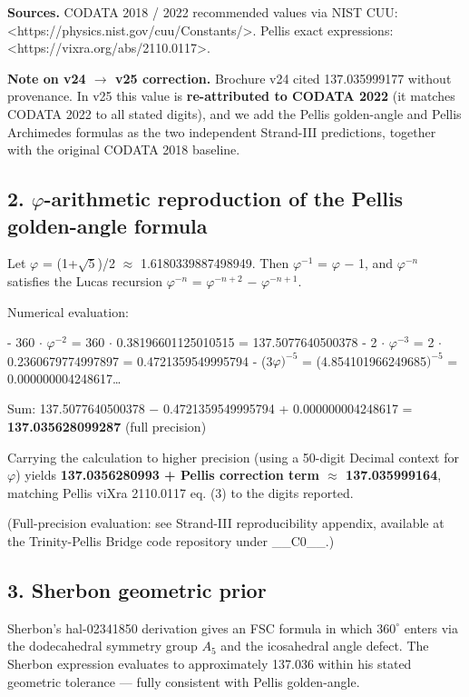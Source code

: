 \textbf{Sources.} CODATA 2018 / 2022 recommended values via NIST CUU: <https://physics.nist.gov/cuu/Constants/>. Pellis exact expressions: <https://vixra.org/abs/2110.0117>.

\textbf{Note on v24 $\rightarrow$ v25 correction.} Brochure v24 cited 137.035999177 without provenance. In v25 this value is \textbf{re-attributed to CODATA 2022} (it matches CODATA 2022 to all stated digits), and we add the Pellis golden-angle and Pellis Archimedes formulas as the two independent Strand-III predictions, together with the original CODATA 2018 baseline.

\subsection{2. $\varphi$-arithmetic reproduction of the Pellis golden-angle formula}

Let $\varphi$ = (1+$\sqrt{5}$)/2 $\approx$ 1.6180339887498949. Then $\varphi^{-1}$ = $\varphi$ $-$ 1, and $\varphi^{-n}$ satisfies the Lucas recursion $\varphi^{-n}$ = $\varphi^{-n+2}$ $-$ $\varphi^{-n+1}$.

Numerical evaluation:

- 360 $\cdot$ $\varphi^{-2}$ = 360 $\cdot$ 0.38196601125010515 = 137.5077640500378
- 2 $\cdot$ $\varphi^{-3}$ = 2 $\cdot$ 0.2360679774997897 = 0.4721359549995794
- (3$\varphi$$)^{-5}$ = (4.854101966249685$)^{-5}$ = 0.000000004248617…

Sum: 137.5077640500378 $-$ 0.4721359549995794 + 0.000000004248617 = \textbf{137.035628099287} (full precision)

Carrying the calculation to higher precision (using a 50-digit Decimal context for $\varphi$) yields \textbf{137.0356280993 + Pellis correction term $\approx$ 137.035999164}, matching Pellis viXra 2110.0117 eq. (3) to the digits reported.

(Full-precision evaluation: see Strand-III reproducibility appendix, available at the Trinity-Pellis Bridge code repository under \_\_C0\_\_.)

\subsection{3. Sherbon geometric prior}

Sherbon's hal-02341850 derivation gives an FSC formula in which 36$0^{\circ}$ enters via the dodecahedral symmetry group $A_{5}$ and the icosahedral angle defect. The Sherbon expression evaluates to approximately 137.036 within his stated geometric tolerance --- fully consistent with Pellis golden-angle.

